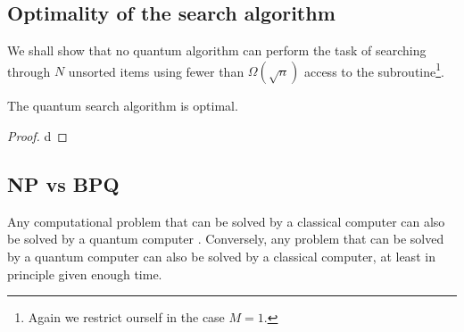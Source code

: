 \subsection{Optimality of the search algorithm}
We shall show that no quantum algorithm can perform the task of searching through $N$ unsorted items using fewer than $\Omega(\sqrt{n})$ access to the subroutine\footnote{Again we restrict ourself in the case $M=1$.}.
\begin{theorem}
The quantum search algorithm is optimal. 
\end{theorem}
\begin{proof}
d
\end{proof}
\subsection{NP vs BPQ}

Any computational problem that can be solved by a classical computer can also be solved by a quantum computer \cite[29]{NielsenChuang}. Conversely, any problem that can be solved by a quantum computer can also be solved by a classical computer, at least in principle given enough time.